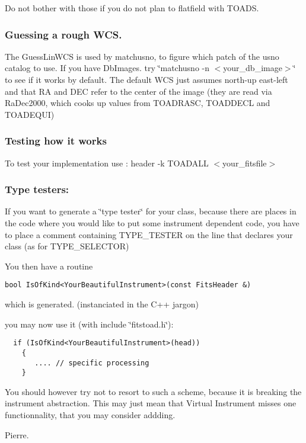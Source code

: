 Do not bother with those if you do not plan to flatfield with TOADS.

\subsubsection{Guessing a rough WCS.}\label{guess_wcs}


The Guess\-Lin\-WCS is used by matchusno, to figure which patch of the  usno catalog to use. If you have Db\-Images. try \char`\"{}matchusno -n $<$your\_\-db\_\-image$>$\char`\"{} to see if it works by default. The default WCS just assumes north-up east-left and that RA and DEC refer to the center of the image (they are read via Ra\-Dec2000, which cooks up values from TOADRASC, TOADDECL and TOADEQUI)

\subsubsection{Testing how it works}\label{test_fitstoad}
 To test your implementation use : header -k TOADALL $<$your\_\-fitsfile$>$

\subsubsection{Type testers:}\label{type_tester}


If you want to generate a \char`\"{}type tester\char`\"{} for your class, because there are places in the code where you would like to put some instrument dependent code, you have to place a comment containing TYPE\_\-TESTER on the line that declares your class (as for  TYPE\_\-SELECTOR)

You then have a routine \footnotesize\begin{verbatim}bool IsOfKind<YourBeautifulInstrument>(const FitsHeader &) \end{verbatim}\normalsize 
 which is generated. (instanciated in the C++ jargon)

you may now use it (with include \char`\"{}fitstoad.h\char`\"{}): \footnotesize\begin{verbatim}  if (IsOfKind<YourBeautifulInstrument>(head))
    {
       .... // specific processing
    }\end{verbatim}\normalsize 


You should however try not to resort to such a scheme, because it is breaking the instrument abstraction. This may just mean that Virtual Instrument misses  one functionnality, that you may consider addding.

Pierre.

